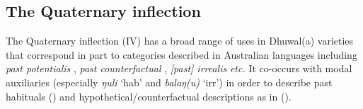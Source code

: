 %
%
%


\subsection{The Quaternary inflection}\label{desc-iv}


The Quaternary inflection (\gls{IV}) has a broad range of uses in Dhuwal(a) varieties that correspond in part to categories described in Australian languages including \textit{past potentialis} \citep{Heath1980a}, \textit{past counterfactual} \cite{McKay2011}, \textit{[past] irrealis} \citep[159]{Austin1998} \textit{etc.} It co-occurs with modal auxiliaries (especially \textit{ŋuli} `\gls{hab}' and \textit{balaŋ(u)} `\gls{irr}') in order to describe past habituals () and hypothetical/counterfactual descriptions as in ().


